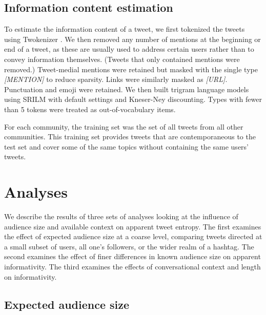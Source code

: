 \documentclass[11pt,letterpaper]{article}
\begin{document}
\subsection{Information content estimation}

To estimate the information content of a tweet, we first tokenized the tweets using Twokenizer \cite{owoputi2013}. We then removed any number of mentions at the beginning or end of a tweet, as these are usually used to address certain users rather than to convey information themselves. (Tweets that only contained mentions were removed.)  Tweet-medial mentions were retained but masked with the single type {\it [MENTION]} to reduce sparsity. Links were similarly masked as {\it [URL]}. Punctuation and emoji were retained. We then built trigram language models using SRILM with default settings and Kneser-Ney discounting.  Types with fewer than 5 tokens were treated as out-of-vocabulary items. 

For each community, the training set was the set of all tweets from all other communities.  This training set provides tweets that are contemporaneous to the test set and cover some of the same topics without containing the same users' tweets.

\section{Analyses}

We describe the results of three sets of analyses looking at the influence of audience size and available context on apparent tweet entropy. The first examines the effect of expected audience size at a coarse level, comparing tweets directed at a small subset of users, all one's followers, or the wider realm of a hashtag.   The second examines the effect of finer differences in known audience size on apparent informativity.  The third examines the effects of conversational context and length on informativity.

\subsection{Expected audience size}
\label{sec:expected}
\end{document}
